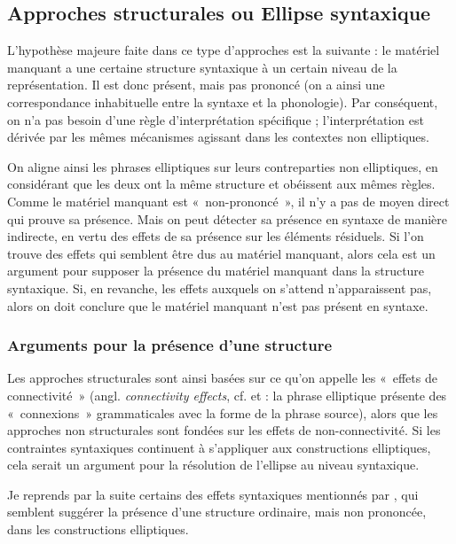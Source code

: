 \subsection{Approches structurales ou Ellipse syntaxique} \label{ch1:sect1.5.1}

L’hypothèse majeure faite dans ce type d’approches est la suivante : le matériel manquant a une certaine structure syntaxique à un certain niveau de la représentation. Il est donc présent, mais pas prononcé (on a ainsi une correspondance inhabituelle entre la syntaxe et la phonologie). Par conséquent, on n’a pas besoin d’une règle d’interprétation spécifique ; l’interprétation est dérivée par les mêmes mécanismes agissant dans les contextes non elliptiques. 

On aligne ainsi les phrases elliptiques sur leurs contreparties non elliptiques, en considérant que les deux ont la même structure et obéissent aux mêmes règles. Comme le matériel manquant est «~non-prononcé~», il n’y a pas de moyen direct qui prouve sa présence. Mais on peut détecter sa présence en syntaxe de manière indirecte, en vertu des effets de sa présence sur les éléments résiduels. Si l’on trouve des effets qui semblent être dus au matériel manquant, alors cela est un argument pour supposer la présence du matériel manquant dans la structure syntaxique. Si, en revanche, les effets auxquels on s’attend n’apparaissent pas, alors on doit conclure que le matériel manquant n’est pas présent en syntaxe.


\subsubsection{Arguments pour la présence d’une structure} \label{ch1:sect1.5.1.1}

Les approches structurales sont ainsi basées sur ce qu’on appelle les «~effets de connectivité~» (angl. \textit{connectivity effects}, cf. \citealt{Merchant2001} et \citealt{Merchant2004} : la phrase elliptique présente des «~connexions~» grammaticales avec la forme de la phrase source), alors que les approches non structurales sont fondées sur les effets de non-connectivité. Si les contraintes syntaxiques continuent à s’appliquer aux constructions elliptiques, cela serait un argument pour la résolution de l’ellipse au niveau syntaxique.

Je reprends par la suite certains des effets syntaxiques mentionnés par \citet{Merchant2004,Merchant2009}, qui semblent suggérer la présence d’une structure ordinaire, mais non prononcée, dans les constructions elliptiques.

